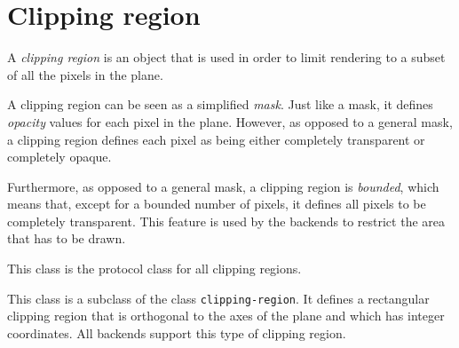 \chapter{Clipping region}
\label{chap-clipping-region}

A \emph{clipping region} is an object that is used in order to limit
rendering to a subset of all the pixels in the plane.  

A clipping region can be seen as a simplified \emph{mask}.  Just like
a mask, it defines \emph{opacity} values for each pixel in the plane.
However, as opposed to a general mask, a clipping region defines each
pixel as being either completely transparent or completely opaque.

Furthermore, as opposed to a general mask, a clipping region is
\emph{bounded}, which means that, except for a bounded number of
pixels, it defines all pixels to be completely transparent.  This
feature is used by the backends to restrict the area that has to be
drawn.


This class is the protocol class for all clipping regions.


This class is a subclass of the class \texttt{clipping-region}.  It
defines a rectangular clipping region that is orthogonal to the axes
of the plane and which has integer coordinates.  All backends support
this type of clipping region.
